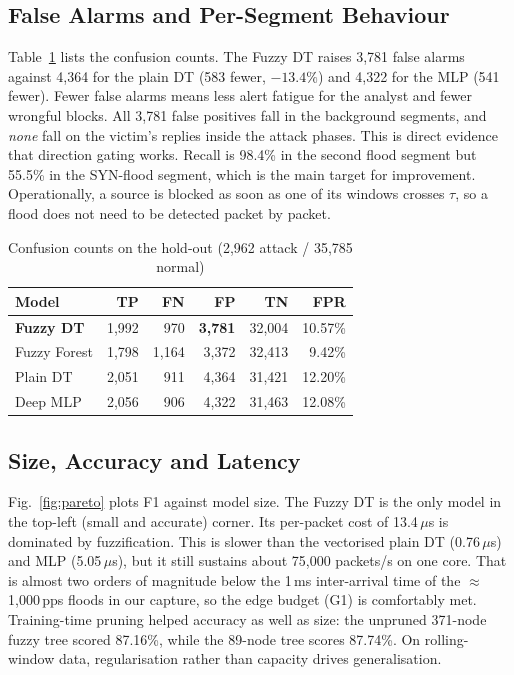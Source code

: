 \documentclass[conference]{IEEEtran}
\begin{document}
\subsection{False Alarms and Per-Segment Behaviour}
Table~\ref{tab:confusion} lists the confusion counts. The Fuzzy DT raises 3,781 false alarms against 4,364 for the plain DT (583 fewer, $-13.4\%$) and 4,322 for the MLP (541 fewer). Fewer false alarms means less alert fatigue for the analyst and fewer wrongful blocks. All 3,781 false positives fall in the background segments, and \emph{none} fall on the victim's replies inside the attack phases. This is direct evidence that direction gating works. Recall is 98.4\% in the second flood segment but 55.5\% in the SYN-flood segment, which is the main target for improvement. Operationally, a source is blocked as soon as one of its windows crosses $\tau$, so a flood does not need to be detected packet by packet.

\begin{table}[t]
\centering
\caption{Confusion counts on the hold-out (2,962 attack / 35,785 normal)}
\label{tab:confusion}
\footnotesize
\renewcommand{\arraystretch}{1.08}
\setlength{\tabcolsep}{4.5pt}
\begin{tabular}{@{}l r r r r r@{}}
\toprule
\textbf{Model} & \textbf{TP} & \textbf{FN} & \textbf{FP} & \textbf{TN} & \textbf{FPR} \\
\midrule
\textbf{Fuzzy DT} & 1,992 & 970 & \textbf{3,781} & 32,004 & 10.57\% \\
Fuzzy Forest & 1,798 & 1,164 & 3,372 & 32,413 & 9.42\% \\
Plain DT & 2,051 & 911 & 4,364 & 31,421 & 12.20\% \\
Deep MLP & 2,056 & 906 & 4,322 & 31,463 & 12.08\% \\
\bottomrule
\end{tabular}
\end{table}

\subsection{Size, Accuracy and Latency}
Fig.~\ref{fig:pareto} plots F1 against model size. The Fuzzy DT is the only model in the top-left (small and accurate) corner. Its per-packet cost of 13.4\,$\mu$s is dominated by fuzzification. This is slower than the vectorised plain DT (0.76\,$\mu$s) and MLP (5.05\,$\mu$s), but it still sustains about 75,000 packets/s on one core. That is almost two orders of magnitude below the 1\,ms inter-arrival time of the $\approx$1,000\,pps floods in our capture, so the edge budget (G1) is comfortably met. Training-time pruning helped accuracy as well as size: the unpruned 371-node fuzzy tree scored 87.16\%, while the 89-node tree scores 87.74\%. On rolling-window data, regularisation rather than capacity drives generalisation.
\end{document}
